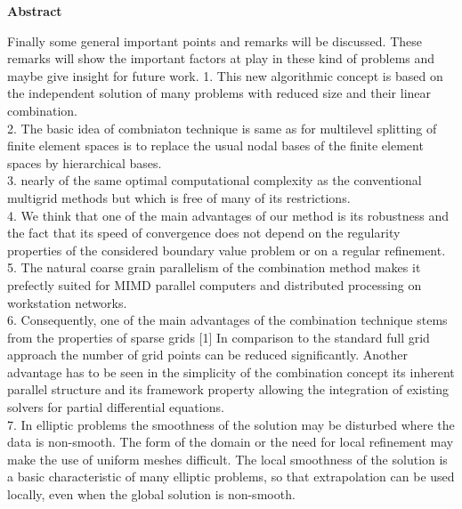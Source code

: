 

\clearemptydoublepage
{}
{}	


\vspace*{2cm}
\begin{center}
{\Large \bf Abstract}
\end{center}
\vspace{1cm}

Finally some general important points and remarks will be discussed. These remarks will show the important factors at play in these kind of problems and maybe give insight for future work.
1. This new algorithmic concept is based on the independent solution of many problems with reduced size and their linear combination. \cite{Griebel1992}\\
2. The basic idea of combniaton technique is same as for multilevel splitting of finite element spaces is to replace the usual nodal bases of the finite element spaces by hierarchical bases.\cite{Yserentant1986} \\
3. nearly of the same optimal computational complexity as the conventional multigrid methods but which is free of many of its restrictions. \cite{Yserentant1986} \\
4. We think that one of the main advantages of our method is its robustness and the fact that its speed of convergence does not depend on the regularity properties of the considered boundary value problem or on a regular refinement.\cite{Yserentant1986} \\
5. The natural coarse grain parallelism of the combination method makes it prefectly suited for MIMD parallel computers and distributed processing on workstation networks.\cite{Griebel1992} \\

6. Consequently, one of the main advantages of the combination technique stems from the properties of sparse grids [1] In comparison to the standard full grid approach the number of grid points can be reduced significantly. Another advantage has to be seen in the simplicity of the combination concept its inherent parallel structure and its framework property allowing the integration of existing solvers for partial differential equations.\cite{Bungartz1994}\\

7. In elliptic problems the smoothness of the solution may be disturbed where the data is non-smooth. The form of the domain or the need for local refinement may make the use of uniform meshes difficult.  The local smoothness of the solution is a basic characteristic of many elliptic problems, so that extrapolation can be used locally, even when the global solution is non-smooth.\cite{Rude1994} \\

